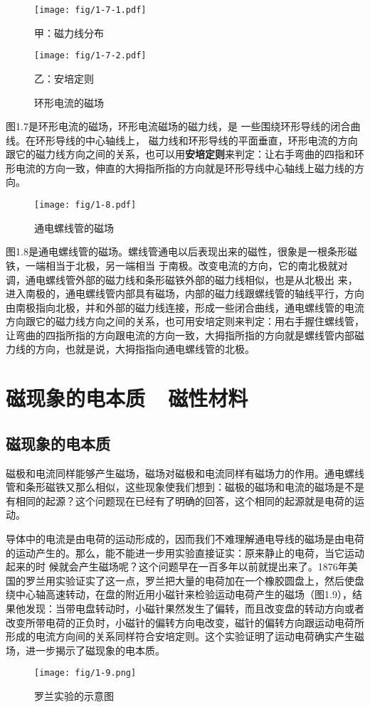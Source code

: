 \begin{figure}[htp]
\centering
\begin{minipage}[t]{0.48\textwidth}
\centering
\texttt{[image: fig/1-7-1.pdf]}
\caption*{甲：磁力线分布}
\end{minipage}
\begin{minipage}[t]{0.48\textwidth}
\centering
\texttt{[image: fig/1-7-2.pdf]}
\caption*{乙：安培定则}
\end{minipage}
\caption{环形电流的磁场}
\end{figure}

图1.7是环形电流的磁场，环形电流磁场的磁力线，是
一些围绕环形导线的闭合曲线。在环形导线的中心轴线上，
磁力线和环形导线的平面垂直，环形电流的方向跟它的磁力线方向之间的关系，也可以用\textbf{安培定则}来判定：让右手弯曲的四指和环形电流的方向一致，伸直的大拇指所指的方向就是环形导线中心轴线上磁力线的方向。

\begin{figure}[htp]\centering
\texttt{[image: fig/1-8.pdf]}
\caption{通电螺线管的磁场}
\end{figure}

图1.8是通电螺线管的磁场。螺线管通电以后表现出来的磁性，很象是一根条形磁铁，一端相当于北极，另一端相当
于南极。改变电流的方向，它的南北极就对调，通电螺线管外部的磁力线和条形磁铁外部的磁力线相似，也是从北极出
来，进入南极的，通电螺线管内部具有磁场，内部的磁力线跟螺线管的轴线平行，方向由南极指向北极，并和外部的磁力线连接，形成一些闭合曲线，通电螺线管的电流方向跟它的磁力线方向之间的关系，也可用安培定则来判定：用右手握住螺线管，让弯曲的四指所指的方向跟电流的方向一致，大拇指所指的方向就是螺线管内部磁力线的方向，也就是说，大拇指指向通电螺线管的北极。

\section{磁现象的电本质~~磁性材料}
\subsection{磁现象的电本质}


磁极和电流同样能够产生磁场，磁场对磁极和电流同样有磁场力的作用。通电螺线管和条形磁铁又那么相似，这些现象使我们想到：磁极的磁场和电流的磁场是不是有相同的起源？这个问题现在已经有了明确的回答，这个相同的起源就是电荷的运动。

导体中的电流是由电荷的运动形成的，因而我们不难理解通电导线的磁场是由电荷的运动产生的。那么，能不能进一步用实验直接证实：原来静止的电荷，当它运动起来的时
候就会产生磁场呢？这个问题早在一百多年以前就提出来了。1876年美国的罗兰用实验证实了这一点，罗兰把大量的电荷加在一个橡胶圆盘上，然后使盘绕中心轴高速转动，在盘的附近用小磁针来检验运动电荷产生的磁场（图1.9），结果他发现：当带电盘转动时，小磁针果然发生了偏转，而且改变盘的转动方向或者改变所带电荷的正负时，小磁针的偏转方向电改变，磁针的偏转方向跟运动电荷所形成的电流方向间的关系同样符合安培定则。这个实验证明了运动电荷确实产生磁场，进一步揭示了磁现象的电本质。
\begin{figure}[htp]\centering
\texttt{[image: fig/1-9.png]}
\caption{罗兰实验的示意图}
\end{figure}

